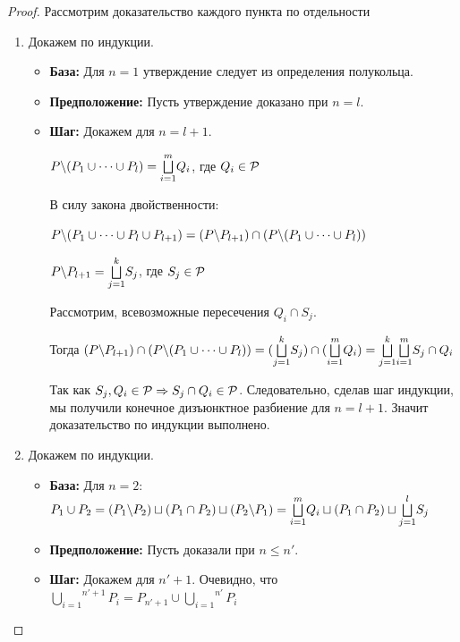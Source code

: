 \begin{proof} Рассмотрим доказательство каждого пункта по отдельности
\begin{enumerate}
    \item Докажем по индукции.
    
    \begin{itemize}
        \item \textbf{База:} Для $n = 1$ утверждение следует из определения полукольца.
        \item \textbf{Предположение:} Пусть утверждение доказано при $n = l$.
        \item \textbf{Шаг:} Докажем для $n = l + 1$.

        $P \backslash (P_1 \cup \dots \cup P_l) = \overset{m}{\underset{i = 1}{\bigsqcup}}Q_i$, где $Q_i \in \mathcal{P}$

        В силу закона двойственности: 

        $P \backslash (P_1 \cup \dots \cup P_l \cup P_{l+1}) = (P \backslash P_{l + 1}) \cap (P \backslash (P_1 \cup \dots \cup P_l))$

        $P \backslash P_{l + 1} = \overset{k}{\underset{j = 1}{\bigsqcup}} S_j$, где $S_j \in \mathcal{P}$

        Рассмотрим, всевозможные пересечения $Q_i \cap S_j$.
        
        Тогда $(P \backslash P_{l + 1}) \cap (P \backslash (P_1 \cup \dots \cup P_l)) = (\overset{k}{\underset{j = 1}{\bigsqcup}} S_j) \cap (\overset{m}{\underset{i = 1}{\bigsqcup}} Q_i) = \overset{k}{\underset{j = 1}{\bigsqcup}}\overset{m}{\underset{i = 1}{\bigsqcup}} S_j \cap Q_i$

        Так как $S_j, Q_i \in \mathcal{P} \Rightarrow S_j \cap Q_i \in \mathcal{P}$. Следовательно, сделав шаг индукции, мы получили конечное дизъюнктное разбиение для $n = l + 1$. Значит доказательство по индукции выполнено.
    \end{itemize}

    \item Докажем по индукции.
    
    \begin{itemize}
        \item \textbf{База:} Для $n = 2$: $P_1 \cup P_2 = (P_1 \backslash P_2) \sqcup (P_1 \cap P_2) \sqcup (P_2 \backslash P_1) = \overset{m}{\underset{i = 1}{\bigsqcup}}Q_i \sqcup (P_1 \cap P_2) \sqcup \overset{l}{\underset{j = 1}{\bigsqcup}}S_j$
        \item \textbf{Предположение:} Пусть доказали при $n \leq n'$.
        \item \textbf{Шаг:} Докажем для $n' + 1$. Очевидно, что $\overset{n' + 1}{\underset{i = 1}{\bigcup}}P_i = P_{n' + 1} \cup \overset{n'}{\underset{i = 1}{\bigcup}}P_i$


\end{itemize}
\end{enumerate}
\end{proof}
